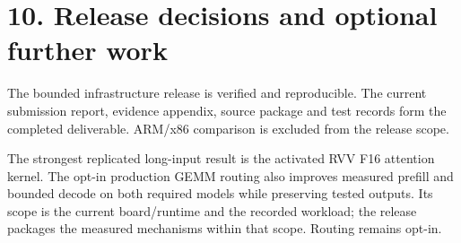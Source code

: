 \documentclass[10pt,a4paper]{article}
\begin{document}
\hypertarget{release-decisions-and-optional-further-work}{%
\section{10. Release decisions and optional further
work}\label{release-decisions-and-optional-further-work}}

The bounded infrastructure release is verified and reproducible. The
current submission report, evidence appendix, source package and test
records form the completed deliverable. ARM/x86 comparison is excluded
from the release scope.

The strongest replicated long-input result is the activated RVV F16
attention kernel. The opt-in production GEMM routing also improves
measured prefill and bounded decode on both required models while
preserving tested outputs. Its scope is the current board/runtime and
the recorded workload; the release packages the measured mechanisms
within that scope. Routing remains opt-in.
\end{document}
